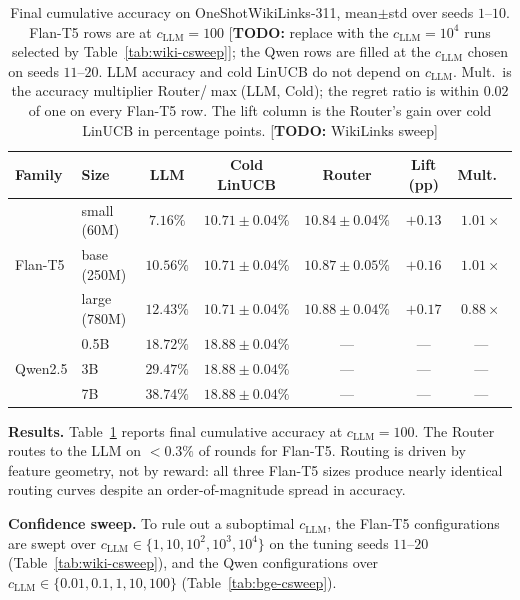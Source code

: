 \documentclass[anon]{alt2027} %
\newcommand{\todo}[1]{\textcolor{red!70!black}{[\textbf{TODO:} #1]}}
\begin{document}
\begin{table}[h]
\centering
\caption{Final cumulative accuracy on OneShotWikiLinks-311, mean$\pm$std over
seeds $1$--$10$. Flan-T5 rows are at $c_{\mathrm{LLM}}=100$ \todo{replace with the
$c_{\mathrm{LLM}}=10^4$ runs selected by Table~\ref{tab:wiki-csweep}}; the Qwen rows are filled at the
$c_{\mathrm{LLM}}$ chosen on seeds $11$--$20$. LLM accuracy and cold LinUCB do not depend on
$c_{\mathrm{LLM}}$. Mult.\ is the accuracy multiplier Router/$\max$(LLM, Cold); the regret
ratio is within $0.02$ of one on every Flan-T5 row. The lift column is the
Router's gain over cold LinUCB in percentage points. \todo{WikiLinks sweep}}
\label{tab:wiki-results}
\small
\begin{tabular}{@{}llccccc@{}}
\toprule
Family & Size & LLM & Cold LinUCB & Router & Lift (pp) & Mult.\ \\
\midrule
\multirow{3}{*}{Flan-T5} & small (60M) & $7.16\%$  & $10.71\pm 0.04\%$ & $10.84\pm 0.04\%$ & $+0.13$ & $1.01\times$ \\
& base (250M)   & $10.56\%$ & $10.71\pm 0.04\%$ & $10.87\pm 0.05\%$ & $+0.16$ & $1.01\times$ \\
& large (780M)  & $12.43\%$ & $10.71\pm 0.04\%$ & $10.88\pm 0.04\%$ & $+0.17$ & $0.88\times$ \\
\midrule
\multirow{3}{*}{Qwen2.5} & 0.5B  & $18.72\%$ & $18.88\pm 0.04\%$ & --- & --- & --- \\
& 3B  & $29.47\%$ & $18.88\pm 0.04\%$ & --- & --- & --- \\
& 7B  & $38.74\%$ & $18.88\pm 0.04\%$ & --- & --- & --- \\
\bottomrule
\end{tabular}
\end{table}

\textbf{Results.} Table~\ref{tab:wiki-results} reports final cumulative
accuracy at $c_{\mathrm{LLM}}=100$. The Router routes to the LLM on $<0.3\%$ of rounds for
Flan-T5. Routing is driven by feature geometry, not by
reward: all three Flan-T5 sizes produce nearly identical routing curves
despite an order-of-magnitude spread in accuracy.

\textbf{Confidence sweep.} To rule out a suboptimal $c_{\mathrm{LLM}}$, the Flan-T5
configurations are swept over $c_{\mathrm{LLM}}\in\{1,10,10^2,10^3,10^4\}$ on the tuning seeds
$11$--$20$ (Table~\ref{tab:wiki-csweep}), and the Qwen configurations over
$c_{\mathrm{LLM}}\in\{0.01,0.1,1,10,100\}$ (Table~\ref{tab:bge-csweep}).
\end{document}
